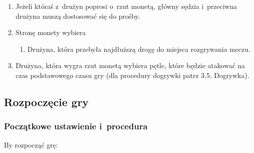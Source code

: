 \documentclass[12pt,a4paper]{article}
\begin{document}
\begin{enumerate}
	\item
	      Jeżeli któraś z~drużyn poprosi o~rzut monetą, główny sędzia i~przeciwna drużyna muszą dostosować się do prośby.
	\item
	      Stronę monety wybiera

	      \begin{enumerate}
		      \item
		            Drużyna, która przebyła najdłuższą drogę do miejsca rozgrywania
		            meczu.
	      \end{enumerate}
	\item
	      Drużyna, która wygra rzut monetą wybiera pętle, które będzie atakować
	      na czas podstawowego czasu gry (dla procedury dogrywki patrz 3.5.
	      Dogrywka).
\end{enumerate}

\subsection{Rozpoczęcie gry}

\subsubsection{Początkowe ustawienie i~procedura}
By rozpocząć grę:
\end{document}
